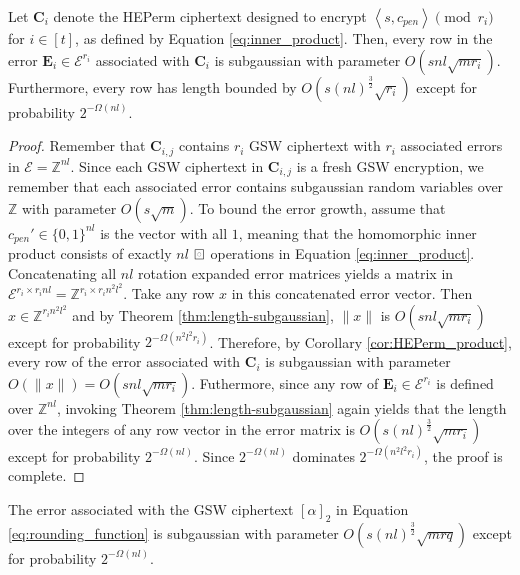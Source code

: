 \begin{lemma}\label{lemma:inner_product_error}
    Let $\mathbf{C}_i$ denote the HEPerm ciphertext designed to encrypt $\left \langle s, c_{pen} \right \rangle \pmod {r_i}$ for $i \in [t]$, as defined by Equation \ref{eq:inner_product}. Then, every row in the error $\mathbf{E}_i \in \mathcal{E}^{r_i}$ associated with $\mathbf{C}_i$ is subgaussian with parameter $O(snl\sqrt{mr_i})$. Furthermore, every row has length bounded by $O(s(nl)^\frac{3}{2}\sqrt{r_i})$ except for probability $2^{-\Omega(nl)}$.
\end{lemma}
\begin{proof}
    Remember that $\mathbf{C}_{i,j}$ contains $r_i$ GSW ciphertext with $r_i$ associated errors in $\mathcal{E} = \mathbb{Z}^{nl}$. Since each GSW ciphertext in $\mathbf{C}_{i,j}$ is a fresh GSW encryption, we remember that each associated error contains subgaussian random variables over $\mathbb{Z}$ with parameter $O(s\sqrt{m})$. To bound the error growth, assume that $c_{pen}' \in \{0,1\}^{nl}$ is the vector with all $1$, meaning that the homomorphic inner product consists of exactly $nl$ $\boxring$ operations in Equation \ref{eq:inner_product}. Concatenating all $nl$ rotation expanded error matrices yields a matrix in $\mathcal{E}^{r_i \times r_i n l} = \mathbb{Z}^{r_i \times r_i n^2l^2}$. Take any row $x$ in this concatenated error vector. Then $x \in \mathbb{Z}^{r_in^2l^2}$ and by Theorem \ref{thm:length-subgaussian}, $\|x\|$ is $O(s n l \sqrt{mr_i})$ except for probability $2^{-\Omega(n^2l^2 r_i)}$. Therefore, by Corollary \ref{cor:HEPerm_product}, every row of the error associated with $\mathbf{C}_i$ is subgaussian with parameter $O(\|x\|) = O(snl\sqrt{m r_i})$. Futhermore, since any row of $\mathbf{E}_i \in \mathcal{E}^{r_i}$ is defined over $\mathbb{Z}^{n l}$, invoking Theorem \ref{thm:length-subgaussian} again yields that the length over the integers of any row vector in the error matrix is $O(s(nl)^\frac{3}{2}\sqrt{m r_i})$ except for probability $2^{-\Omega(nl)}$. Since $2^{-\Omega(nl)}$ dominates $2^{-\Omega(n^2l^2 r_i)}$, the proof is complete.
\end{proof}
\begin{theorem}\label{thm:bootstrap_error}
    The error associated with the GSW ciphertext $[\alpha]_2$ in Equation \ref{eq:rounding_function} is subgaussian with parameter $O(s(nl)^\frac{3}{2}\sqrt{mrq})$ except for probability $2^{-\Omega(nl)}$. 
\end{theorem}
